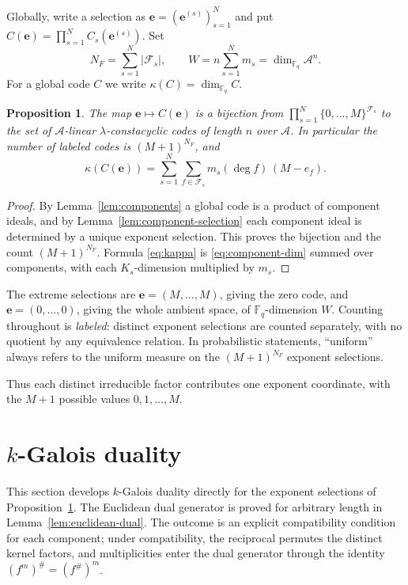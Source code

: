 \documentclass[preprint,12pt,a4paper]{elsarticle}
\newcommand{\F}{\mathbb F}
\newcommand{\A}{\mathcal A}
\newcommand{\Fs}{\mathcal F_s}
\newtheorem{proposition}[theorem]{Proposition}
\theoremstyle{definition}
\theoremstyle{remark}
\begin{document}
Globally, write a selection as
$\mathbf{e}=(\mathbf{e}^{(s)})_{s=1}^{N}$ and put
$C(\mathbf{e})=\prod_{s=1}^{N}C_s(\mathbf{e}^{(s)})$.  Set
\[
N_F=\sum_{s=1}^{N}|\Fs|,
\qquad
W=n\sum_{s=1}^{N}m_s=\dim_{\F_q}\A^n .
\]
For a global code $C$ we write $\kappa(C)=\dim_{\F_q}C$.

\begin{proposition}\label{prop:global-selection}
The map $\mathbf{e}\mapsto C(\mathbf{e})$ is a bijection from
$\prod_{s=1}^{N}\{0,\ldots,M\}^{\Fs}$ to the set of $\A$-linear
$\lambda$-constacyclic codes of length $n$ over $\A$.  In particular the number
of labeled codes is $(M+1)^{N_F}$, and
\begin{equation}\label{eq:kappa}
\kappa(C(\mathbf{e}))
   =\sum_{s=1}^{N}\sum_{f\in\Fs}m_s(\deg f)\,(M-e_f).
\end{equation}
\end{proposition}

\begin{proof}
By Lemma~\ref{lem:components} a global code is a product of component ideals,
and by Lemma~\ref{lem:component-selection} each component ideal is determined
by a unique exponent selection.  This proves the bijection and the count
$(M+1)^{N_F}$.  Formula \eqref{eq:kappa} is \eqref{eq:component-dim} summed
over components, with each $K_s$-dimension multiplied by $m_s$.
\end{proof}

The extreme selections are $\mathbf{e}=(M,\ldots,M)$, giving the zero code, and
$\mathbf{e}=(0,\ldots,0)$, giving the whole ambient space, of $\F_q$-dimension
$W$.  Counting throughout is \emph{labeled}: distinct exponent selections are
counted separately, with no quotient by any equivalence relation.  In
probabilistic statements, ``uniform'' always refers to the uniform measure on
the $(M+1)^{N_F}$ exponent selections.

Thus each distinct irreducible factor contributes one exponent coordinate,
with the $M+1$ possible values $0,1,\ldots,M$.

\section{\texorpdfstring{$k$}{k}-Galois duality}\label{sec:duality}

This section develops $k$-Galois duality directly for the exponent
selections of Proposition~\ref{prop:global-selection}.  The Euclidean dual
generator is proved for arbitrary length in
Lemma~\ref{lem:euclidean-dual}.  The outcome is an explicit compatibility
condition for each component; under compatibility, the reciprocal permutes
the distinct kernel factors, and multiplicities enter the dual generator
through the identity $(f^m)^{\#}=(f^{\#})^m$.
\end{document}
